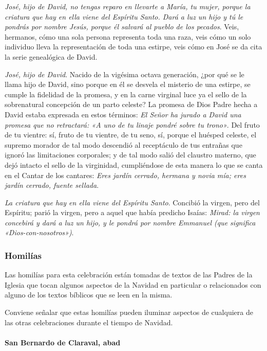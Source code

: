 \documentclass[]{article}
\let\oldparagraph\paragraph
\renewcommand{\paragraph}[1]{\oldparagraph{#1}\mbox{}}
\begin{document}
\emph{José, hijo de David, no tengas reparo en llevarte a María, tu
mujer, porque la criatura que hay en ella viene del Espíritu Santo. Dará
a luz un hijo y tú le pondrás por nombre Jesús, porque él salvará al
pueblo de los pecados}. Veis, hermanos, cómo una sola persona representa
toda una raza, veis cómo un solo individuo lleva la representación de
toda una estirpe, veis cómo en José se da cita la serie genealógica de
David.

\emph{José, hijo de David}. Nacido de la vigésima octava generación,
¿por qué se le llama hijo de David, sino porque en él se desvela el
misterio de una estirpe, se cumple la fidelidad de la promesa, y en la
carne virginal luce ya el sello de la sobrenatural concepción de un
parto celeste? La promesa de Dios Padre hecha a David estaba expresada
en estos términos: \emph{El Señor ha jurado a David una promesa que no
retractará: «A uno de tu linaje pondré sobre tu trono»}. Del fruto de tu
vientre: sí, fruto de tu vientre, de tu seno, sí, porque el huésped
celeste, el supremo morador de tal modo descendió al receptáculo de tus
entrañas que ignoró las limitaciones corporales; y de tal modo salió del
claustro materno, que dejó intacto el sello de la virginidad,
cumpliéndose de esta manera lo que se canta en el Cantar de los
cantares: \emph{Eres jardín cerrado, hermana y novia mía; eres jardín
cerrado, fuente sellada}.

\emph{La criatura que hay en ella viene del Espíritu Santo}. Concibió la
virgen, pero del Espíritu; parió la virgen, pero a aquel que había
predicho Isaías: \emph{Mirad: la virgen concebirá y dará a luz un hijo,
y le pondrá por nombre Emmanuel (que significa
«Dios-con-nosotros»)}.

\protect\hypertarget{_Ref448166100}{}{\protect\hypertarget{_Toc448662774}{}{}}

\subsubsection{Homilías}\label{homiluxedas-4}

Las homilías para esta celebración están tomadas de textos de las Padres
de la Iglesia que tocan algunos aspectos de la Navidad en particular o
relacionados con alguno de los textos bíblicos que se leen en la misma.

Conviene señalar que estas homilías pueden iluminar aspectos de
cualquiera de las otras celebraciones durante el tiempo de Navidad.

\paragraph{San Bernardo de Claraval,
abad}\label{san-bernardo-de-claraval-abad}
\end{document}
